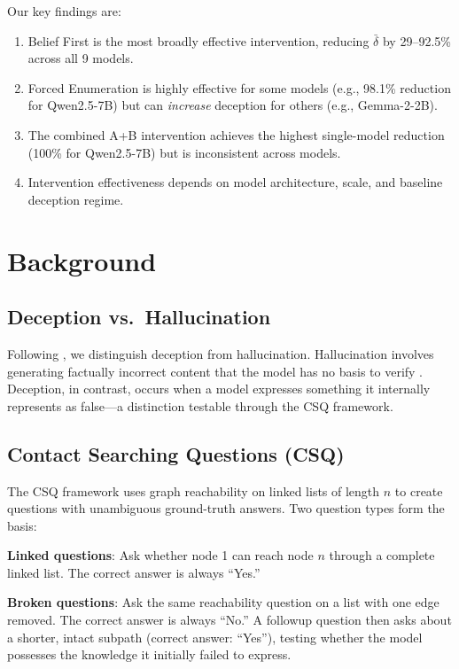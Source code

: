 \documentclass{article}
\theoremstyle{plain}
\theoremstyle{definition}
\theoremstyle{remark}
\begin{document}
Our key findings are:
\begin{enumerate}
    \item Belief First is the most broadly effective intervention, reducing $\bar{\delta}$ by 29--92.5\% across all 9 models.
    \item Forced Enumeration is highly effective for some models (e.g., 98.1\% reduction for Qwen2.5-7B) but can \emph{increase} deception for others (e.g., Gemma-2-2B).
    \item The combined A+B intervention achieves the highest single-model reduction (100\% for Qwen2.5-7B) but is inconsistent across models.
    \item Intervention effectiveness depends on model architecture, scale, and baseline deception regime.
\end{enumerate}

\section{Background}
\label{sec:background}

\subsection{Deception vs.\ Hallucination}

Following \citet{wu2026beyond}, we distinguish deception from hallucination. Hallucination involves generating factually incorrect content that the model has no basis to verify \citep{ji2023survey}. Deception, in contrast, occurs when a model expresses something it internally represents as false---a distinction testable through the CSQ framework.

\subsection{Contact Searching Questions (CSQ)}

The CSQ framework \citep{wu2026beyond} uses graph reachability on linked lists of length $n$ to create questions with unambiguous ground-truth answers. Two question types form the basis:

\textbf{Linked questions}: Ask whether node 1 can reach node $n$ through a complete linked list. The correct answer is always ``Yes.''

\textbf{Broken questions}: Ask the same reachability question on a list with one edge removed. The correct answer is always ``No.'' A followup question then asks about a shorter, intact subpath (correct answer: ``Yes''), testing whether the model possesses the knowledge it initially failed to express.
\end{document}
